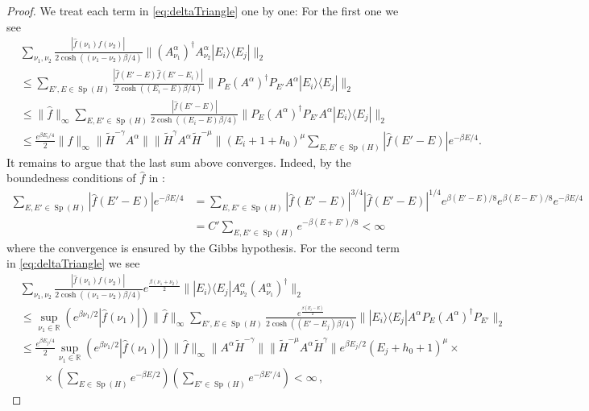 \documentclass[11pt]{amsart}
\newcommand{\1}{\mathbbm{1}}
\newcommand{\R}{\mathbb{R}}
\newcommand{\spec}{\operatorname{Sp}}
\theoremstyle{plain}
\theoremstyle{definition}
\theoremstyle{remark}
\numberwithin{equation}{section}
\begin{document}
\begin{proof}
We treat each term in \eqref{eq:deltaTriangle} one by one: For the first one we see 
\begin{align*}
&\sum_{\nu_1,\nu_2} \frac{|\widehat{f}(\nu_1)\widehat{f}(\nu_2)|\,}{2\cosh((\nu_1-\nu_2)\beta/4)}\|(A^\alpha_{\nu_1} )^\dagger A^\alpha_{\nu_2}|E_i\rangle\langle E_j|\|_2 \\
&\le \sum_{E',E\in\spec(H)} \frac{|\widehat{f}(E'-E)\widehat{f}(E'-E_i)|\,}{2\cosh((E_i-E)\beta/4)}\|P_E(A^\alpha)^\dagger P_{E'}A^\alpha|E_i\rangle\langle E_j|\|_2  \\
&\le \|\widehat f\|_\infty \sum_{E,E'\in\spec(H)} \frac{|\widehat{f}(E'-E)|}{2\cosh((E_i-E)\beta/4)}\|P_E(A^\alpha)^\dagger P_{E'}A^\alpha|E_i\rangle\langle E_j|\|_2 \\
&\le\frac{e^{\beta E_i/4}}{2}\|\widehat f\|_\infty\|\widetilde H^{-\gamma}A^\alpha\| \|\widetilde H^{\gamma}A^\alpha\widetilde H^{-\mu}\| (E_i+1+h_0)^\mu\sum_{E,E'\in\spec(H)}|\widehat{f}(E'-E)| e^{-\beta E/4}.
\end{align*}
It remains to argue that the last sum above converges. Indeed, by the  boundedness conditions of $\widehat{f}$ in : 
\begin{align*}
\sum_{E,E'\in\spec(H)}|\widehat{f}(E'-E)| e^{-\beta E/4}&=\sum_{E,E'\in\spec(H)}|\widehat{f}(E'-E)|^{3/4} |\widehat{f}(E'-E)|^{1/4}e^{\beta(E'-E)/8}e^{\beta(E-E')/8}e^{-\beta E/4}\\
&=C' \sum_{E,E'\in\spec(H)}e^{-\beta(E+E')/8}<\infty
\end{align*}
where the convergence is ensured by the Gibbs hypothesis.
For the second term in \eqref{eq:deltaTriangle} we see
\begin{align*}
    &\sum_{\nu_1,\nu_2} \frac{|\widehat{f}(\nu_1)\widehat{f}(\nu_2)|\,}{2\cosh((\nu_1-\nu_2)\beta/4)}e^{\frac{\beta(\nu_1+\nu_2)}{2}}\||E_i\rangle\langle E_j|A^\alpha_{\nu_2}(A^\alpha_{\nu_1})^\dagger\|_2\\&\le\sup_{\nu_1\in\R} \left(e^{\beta \nu_1/2}|\widehat f(\nu_1)| \right)\|\widehat f\|_\infty\sum_{E',E\in\spec(H)} \frac{e^{\frac{\beta(E_j-E)}{2}}}{2\cosh((E'-E_j)\beta/4)}\||E_i\rangle\langle E_j|A^\alpha P_E(A^\alpha)^\dagger P_{E'}\|_2 \\&\le \frac{e^{\beta E_j/4}}{2}\sup_{\nu_1\in\R} \left(e^{\beta \nu_1/2}|\widehat f(\nu_1)| \right)\|\widehat f\|_\infty \| A^\alpha \widetilde H^{-\gamma}\| \|\widetilde H^{-\mu}A^\alpha \widetilde H^{\gamma}\| e^{\beta E_j/2}(E_j+h_0+1)^\mu \times \\&\qquad\times \left(\sum_{E\in\spec(H)}e^{-\beta E/2}\right)\left(\sum_{E'\in\spec(H)}e^{-\beta E'/4}\right)<\infty\,,

\end{align*}
\end{proof}
\end{document}
